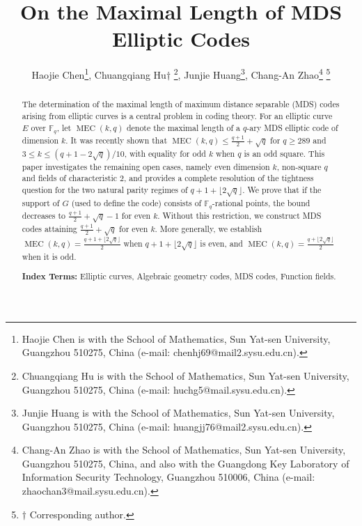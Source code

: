 \documentclass[journal,12pt,onecolumn]{IEEEtran}
\begin{document}
\author{Haojie Chen\thanks{Haojie Chen is with the School of Mathematics, Sun Yat-sen University, Guangzhou 510275, China (e-mail: chenhj69@mail2.sysu.edu.cn).}, Chuangqiang Hu\(\dagger\) \thanks{Chuangqiang Hu is with the School of Mathematics, Sun Yat-sen University, Guangzhou 510275, China (e-mail: huchg5@mail.sysu.edu.cn).}, Junjie Huang\thanks{Junjie Huang is with the School of Mathematics, Sun Yat-sen University, Guangzhou 510275, China (e-mail: huangjj76@mail2.sysu.edu.cn).}, 
Chang-An Zhao\thanks{Chang-An Zhao is with the School of Mathematics, Sun Yat-sen University, Guangzhou 510275, China, and also with the Guangdong Key Laboratory of Information Security Technology, Guangzhou 510006, China (e-mail: zhaochan3@mail.sysu.edu.cn).}
\thanks{\(\dagger\) Corresponding author. } }


\title{On the Maximal Length of MDS Elliptic Codes}


\maketitle

\begin{abstract}
The determination of the maximal length of maximum distance separable (MDS) codes arising from elliptic curves is a central problem in coding theory. For an elliptic curve $E$ over $\mathbb{F}_q$, let $\operatorname{MEC}(k,q)$ denote the maximal length of a $q$-ary MDS elliptic code of dimension $k$. 
It was recently shown that $\operatorname{MEC}(k,q)\le\frac{q+1}{2}+\sqrt{q}$ for $q\ge289$ and $3\le k\le(q+1-2\sqrt{q})/10$, with equality for odd $k$ when $q$ is an odd square. This paper investigates the remaining open cases, namely even dimension $k$, non-square $q$ and fields of characteristic $2$, and provides a complete resolution of the tightness question for the two natural parity regimes of $q+1+\lfloor 2\sqrt{q}\rfloor$. We prove that if the support of $G$ (used to define the code) consists of $\mathbb{F}_q$-rational points, the bound decreases to $\frac{q+1}{2}+\sqrt{q}-1$ for even $k$. Without this restriction, we construct MDS codes attaining $\frac{q+1}{2}+\sqrt{q}$ for even $k$. More generally, we establish $\operatorname{MEC}(k,q)=\frac{q+1+\lfloor2\sqrt{q}\rfloor}{2}$ when $q+1+\lfloor2\sqrt{q}\rfloor$ is even, and $\operatorname{MEC}(k,q)=\frac{q+\lfloor2\sqrt{q}\rfloor}{2}$ when it is odd. 


{\bf Index Terms:} Elliptic curves,  Algebraic geometry codes, MDS codes, Function fields.

\end{abstract}
\end{document}
